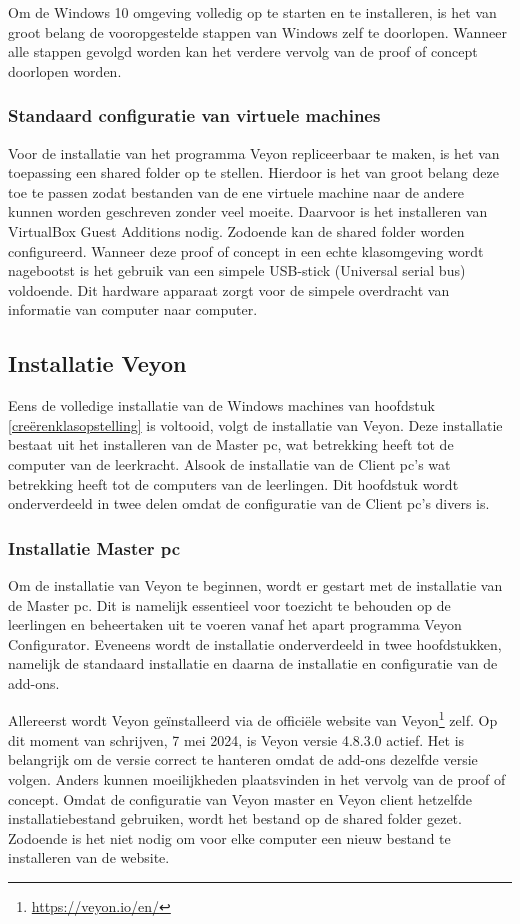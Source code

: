 Om de Windows 10 omgeving volledig op te starten en te installeren, is het van groot belang de vooropgestelde stappen van Windows zelf te doorlopen. Wanneer alle stappen gevolgd worden kan het verdere vervolg van de proof of concept doorlopen worden.

\subsubsection{Standaard configuratie van virtuele machines}
Voor de installatie van het programma Veyon repliceerbaar te maken, is het van toepassing een shared folder op te stellen. Hierdoor is het van groot belang deze toe te passen zodat bestanden van de ene virtuele machine naar de andere kunnen worden geschreven zonder veel moeite. Daarvoor is het installeren van VirtualBox Guest Additions nodig. Zodoende kan de shared folder worden configureerd. Wanneer deze proof of concept in een echte klasomgeving wordt nagebootst is het gebruik van een simpele USB-stick (Universal serial bus) voldoende. Dit hardware apparaat zorgt voor de simpele overdracht van informatie van computer naar computer.

\subsection{Installatie Veyon}
Eens de volledige installatie van de Windows machines van hoofdstuk \ref{creërenklasopstelling} is voltooid, volgt de installatie van Veyon. Deze installatie bestaat uit het installeren van de Master pc, wat betrekking heeft tot de computer van de leerkracht. Alsook de installatie van de Client pc's wat betrekking heeft tot de computers van de leerlingen. Dit hoofdstuk wordt onderverdeeld in twee delen omdat de configuratie van de Client pc's divers is. 
 

\subsubsection{Installatie Master pc}
Om de installatie van Veyon te beginnen, wordt er gestart met de installatie van de Master pc. Dit is namelijk essentieel voor toezicht te behouden op de leerlingen en beheertaken uit te voeren vanaf het apart programma Veyon Configurator. Eveneens wordt de installatie onderverdeeld in twee hoofdstukken, namelijk de standaard installatie en daarna de installatie en configuratie van de add-ons.\newline 

Allereerst wordt Veyon geïnstalleerd via de officiële website van Veyon\footnote{\url{https://veyon.io/en/}} zelf. Op dit moment van schrijven, 7 mei 2024, is Veyon versie 4.8.3.0 actief. Het is belangrijk om de versie correct te hanteren omdat de add-ons dezelfde versie volgen. Anders kunnen moeilijkheden plaatsvinden in het vervolg van de proof of concept. Omdat de configuratie van Veyon master en Veyon client hetzelfde installatiebestand gebruiken, wordt het bestand op de shared folder gezet. Zodoende is het niet nodig om voor elke computer een nieuw bestand te installeren van de website.\newline 


